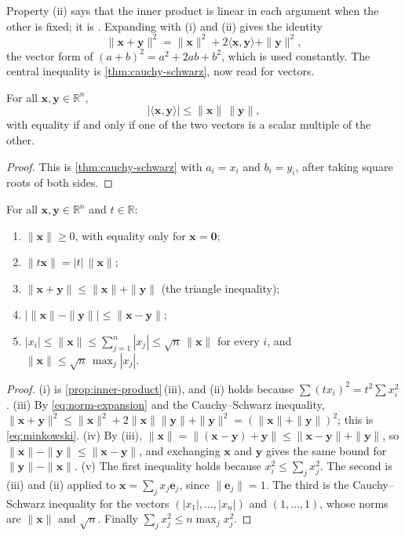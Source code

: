 Property (ii) says that the inner product is linear in each argument when the other is fixed; it is . Expanding with (i) and (ii) gives the identity
\begin{equation}
\|\mathbf x+\mathbf y\|^2=\|\mathbf x\|^2+2\langle\mathbf x,\mathbf y\rangle+\|\mathbf y\|^2 ,
\label{eq:norm-expansion}
\end{equation}
the vector form of $(a+b)^2=a^2+2ab+b^2$, which is used constantly. The central inequality is \cref{thm:cauchy-schwarz}, now read for vectors.

\begin{theorem}
\label{thm:cauchy-schwarz-vectors}
For all $\mathbf x,\mathbf y\in\mathbb R^n$,
\[
|\langle\mathbf x,\mathbf y\rangle|\le\|\mathbf x\|\,\|\mathbf y\| ,
\]
with equality if and only if one of the two vectors is a scalar multiple of the other.
\end{theorem}

\begin{proof}
This is \cref{thm:cauchy-schwarz} with $a_i=x_i$ and $b_i=y_i$, after taking square roots of both sides.
\end{proof}

\begin{proposition}
\label{prop:norm}
For all $\mathbf x,\mathbf y\in\mathbb R^n$ and $t\in\mathbb R$:
\begin{enumerate}
\item $\|\mathbf x\|\ge0$, with equality only for $\mathbf x=\mathbf 0$;
\item $\|t\mathbf x\|=|t|\,\|\mathbf x\|$;
\item $\|\mathbf x+\mathbf y\|\le\|\mathbf x\|+\|\mathbf y\|$ (the triangle inequality);
\item $\bigl|\|\mathbf x\|-\|\mathbf y\|\bigr|\le\|\mathbf x-\mathbf y\|$;
\item $|x_i|\le\|\mathbf x\|\le\sum_{j=1}^n|x_j|\le\sqrt n\,\|\mathbf x\|$ for every $i$, and $\|\mathbf x\|\le\sqrt n\,\max_j|x_j|$.
\end{enumerate}
\end{proposition}

\begin{proof}
(i) is \cref{prop:inner-product}\,(iii), and (ii) holds because $\sum(tx_i)^2=t^2\sum x_i^2$. (iii) By \eqref{eq:norm-expansion} and the Cauchy--Schwarz inequality, $\|\mathbf x+\mathbf y\|^2\le\|\mathbf x\|^2+2\|\mathbf x\|\|\mathbf y\|+\|\mathbf y\|^2=(\|\mathbf x\|+\|\mathbf y\|)^2$; this is \eqref{eq:minkowski}. (iv) By (iii), $\|\mathbf x\|=\|(\mathbf x-\mathbf y)+\mathbf y\|\le\|\mathbf x-\mathbf y\|+\|\mathbf y\|$, so $\|\mathbf x\|-\|\mathbf y\|\le\|\mathbf x-\mathbf y\|$, and exchanging $\mathbf x$ and $\mathbf y$ gives the same bound for $\|\mathbf y\|-\|\mathbf x\|$. (v) The first inequality holds because $x_i^2\le\sum_jx_j^2$. The second is (iii) and (ii) applied to $\mathbf x=\sum_jx_j\mathbf e_j$, since $\|\mathbf e_j\|=1$. The third is the Cauchy--Schwarz inequality for the vectors $(|x_1|,\ldots,|x_n|)$ and $(1,\ldots,1)$, whose norms are $\|\mathbf x\|$ and $\sqrt n$. Finally $\sum_jx_j^2\le n\max_jx_j^2$.
\end{proof}

